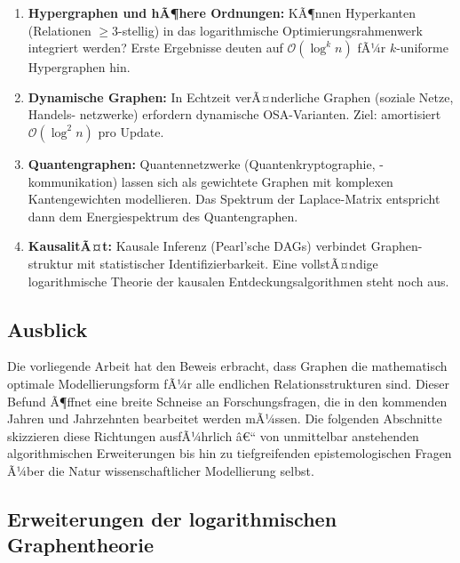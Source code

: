 ﻿\documentclass[12pt,a4paper,twoside]{article}
\theoremstyle{definition}
\theoremstyle{plain}
\theoremstyle{remark}
\begin{document}
\begin{enumerate}
  \item \textbf{Hypergraphen und hÃ¶here Ordnungen:}
        KÃ¶nnen Hyperkanten (Relationen $\geq 3$-stellig) in das
        logarithmische Optimierungsrahmenwerk integriert werden?
        Erste Ergebnisse deuten auf
        $\mathcal{O}(\log^k n)$ fÃ¼r $k$-uniforme Hypergraphen hin.

  \item \textbf{Dynamische Graphen:}
        In Echtzeit verÃ¤nderliche Graphen (soziale Netze, Handels-
        netzwerke) erfordern dynamische OSA-Varianten.  Ziel:
        amortisiert $\mathcal{O}(\log^2 n)$ pro Update.

  \item \textbf{Quantengraphen:}
        Quantennetzwerke (Quantenkryptographie, -kommunikation)
        lassen sich als gewichtete Graphen mit komplexen
        Kantengewichten modellieren.  Das Spektrum der
        Laplace-Matrix entspricht dann dem Energiespektrum
        des Quantengraphen.

  \item \textbf{KausalitÃ¤t:}
        Kausale Inferenz (Pearl'sche DAGs) verbindet Graphen-
        struktur mit statistischer Identifizierbarkeit.  Eine
        vollstÃ¤ndige logarithmische Theorie der kausalen
        Entdeckungsalgorithmen steht noch aus.
\end{enumerate}

\subsection{Ausblick}
\label{sec:ausblick}

Die vorliegende Arbeit hat den Beweis erbracht, dass Graphen die
mathematisch optimale Modellierungsform fÃ¼r alle endlichen
Relationsstrukturen sind.  Dieser Befund Ã¶ffnet eine breite
Schneise an Forschungsfragen, die in den kommenden Jahren und
Jahrzehnten bearbeitet werden mÃ¼ssen.  Die folgenden Abschnitte
skizzieren diese Richtungen ausfÃ¼hrlich â€“ von unmittelbar
anstehenden algorithmischen Erweiterungen bis hin zu tiefgreifenden
epistemologischen Fragen Ã¼ber die Natur wissenschaftlicher
Modellierung selbst.

\subsection{Erweiterungen der logarithmischen Graphentheorie}
\label{sub:log_ext}
\end{document}
